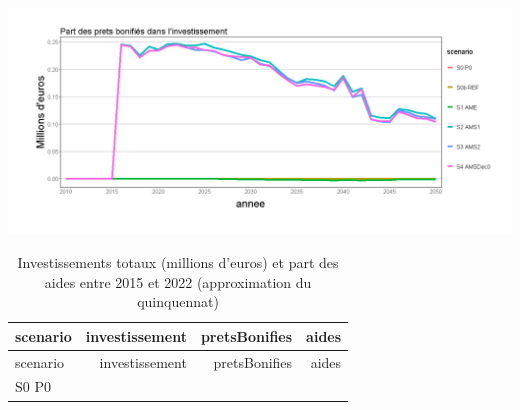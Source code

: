 \documentclass[]{article}
\begin{document}
\includegraphics{Exemple_sortiestertiaire_files/figure-latex/Taux_prets-1.png}

\begin{longtable}[]{@{}lrrr@{}}
\caption{Investissements totaux (millions d'euros) et part des aides
entre 2015 et 2022 (approximation du quinquennat)}\tabularnewline
\toprule
\begin{minipage}[b]{0.16\columnwidth}\raggedright\strut
scenario\strut
\end{minipage} & \begin{minipage}[b]{0.21\columnwidth}\raggedleft\strut
investissement\strut
\end{minipage} & \begin{minipage}[b]{0.20\columnwidth}\raggedleft\strut
pretsBonifies\strut
\end{minipage} & \begin{minipage}[b]{0.09\columnwidth}\raggedleft\strut
aides\strut
\end{minipage}\tabularnewline
\midrule
\endfirsthead
\toprule
\begin{minipage}[b]{0.16\columnwidth}\raggedright\strut
scenario\strut
\end{minipage} & \begin{minipage}[b]{0.21\columnwidth}\raggedleft\strut
investissement\strut
\end{minipage} & \begin{minipage}[b]{0.20\columnwidth}\raggedleft\strut
pretsBonifies\strut
\end{minipage} & \begin{minipage}[b]{0.09\columnwidth}\raggedleft\strut
aides\strut
\end{minipage}\tabularnewline
\midrule
\endhead
\begin{minipage}[t]{0.16\columnwidth}\raggedright\strut
S0 P0\strut
\end{minipage} & \begin{minipage}[t]{0.21\columnwidth}\raggedleft\strut

\end{minipage}
\end{longtable}
\end{document}
